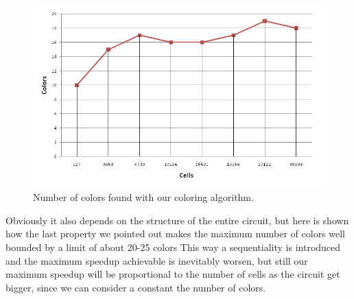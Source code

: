 \begin{figure}[h!tb]
				\centering
				\includegraphics[scale=0.5]{img/color_table.png}
				\caption{Number of colors found with our coloring algorithm.}
				\label{fig:color_table}
\end{figure}
Obviously it also depends on the structure of the entire circuit, but here is shown how the last property we pointed out makes the maximum number of colors well bounded by a limit of about 20-25 colors\newline
This way a sequentiality is introduced and the maximum speedup achievable is inevitably worsen, but still our maximum speedup will be proportional to the number of cells as the circuit get bigger, since we can consider a constant the number of colors.

